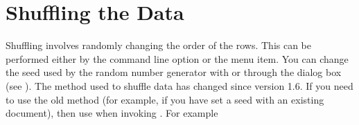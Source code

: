 \section{Shuffling the Data}\label{sec:shuffle}

Shuffling involves randomly changing the order of the rows. This can be
performed either by the  command line option or
the  menu item. You can change
the seed used by the random number generator with
 or through the 
 dialog box (see ).
The method used to shuffle data has changed since version 1.6.
If you need to use the old method (for example, if you
have set a seed with an existing document), then use
 when invoking . For example

